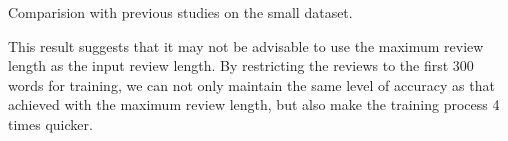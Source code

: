 \documentclass[conference,compsoc]{IEEEtran}
\begin{document}
\begin{table*}[ht]
  \caption{Comparision with previous studies on the small dataset.}
  \label{tab:comparison_small_dataset}
\end{table*}%
This result suggests that it may not be advisable to use the maximum review length as the input review length. By restricting the reviews to the first 300 words for training, we can not only maintain the same level of accuracy as that achieved with the maximum review length, but also make the training process 4 times quicker.

\end{document}
